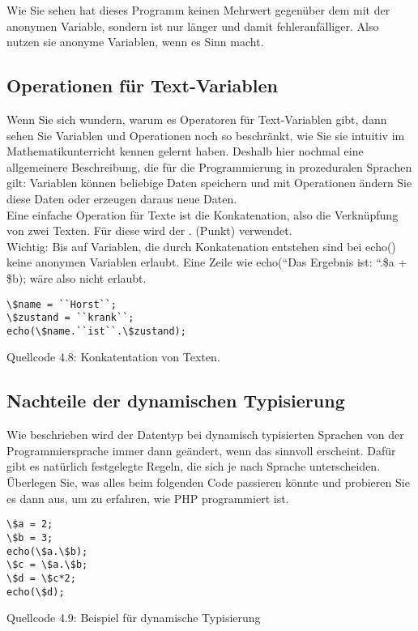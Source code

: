Wie Sie sehen hat dieses Programm keinen Mehrwert gegenüber dem mit der anonymen Variable, sondern ist nur länger und damit fehleranfälliger. Also nutzen sie anonyme Variablen, wenn es Sinn macht.

\subsection{Operationen für Text-Variablen}

Wenn Sie sich wundern, warum es Operatoren für Text-Variablen gibt, dann sehen Sie Variablen und Operationen noch so beschränkt, wie Sie sie intuitiv im Mathematikunterricht kennen gelernt haben. Deshalb hier nochmal eine allgemeinere Beschreibung, die für die Programmierung in prozeduralen Sprachen gilt: Variablen können beliebige Daten speichern und mit Operationen ändern Sie diese Daten oder erzeugen daraus neue Daten.\\

Eine einfache Operation für Texte ist die Konkatenation, also die Verknüpfung von zwei Texten. Für diese wird der . (Punkt) verwendet.\\

Wichtig: Bis auf Variablen, die durch Konkatenation entstehen sind bei echo() keine anonymen Variablen erlaubt. Eine Zeile wie echo(``Das Ergebnis ist: ``.\$a + \$b); wäre also nicht erlaubt.\\

\begin{verbatim}
\$name = ``Horst``;
\$zustand = ``krank``;
echo(\$name.``ist``.\$zustand);
\end{verbatim}
Quellcode 4.8: Konkatentation von Texten.

\subsection{Nachteile der dynamischen Typisierung}

Wie beschrieben wird der Datentyp bei dynamisch typisierten Sprachen von der Programmiersprache immer dann geändert, wenn das sinnvoll erscheint. Dafür gibt es natürlich festgelegte Regeln, die sich je nach Sprache unterscheiden. Überlegen Sie, was alles beim folgenden Code passieren könnte und probieren Sie es dann aus, um zu erfahren, wie PHP programmiert ist.\\

\begin{verbatim}
\$a = 2;
\$b = 3;
echo(\$a.\$b);
\$c = \$a.\$b;
\$d = \$c*2;
echo(\$d);
\end{verbatim}
Quellcode 4.9: Beispiel für dynamische Typisierung\\

